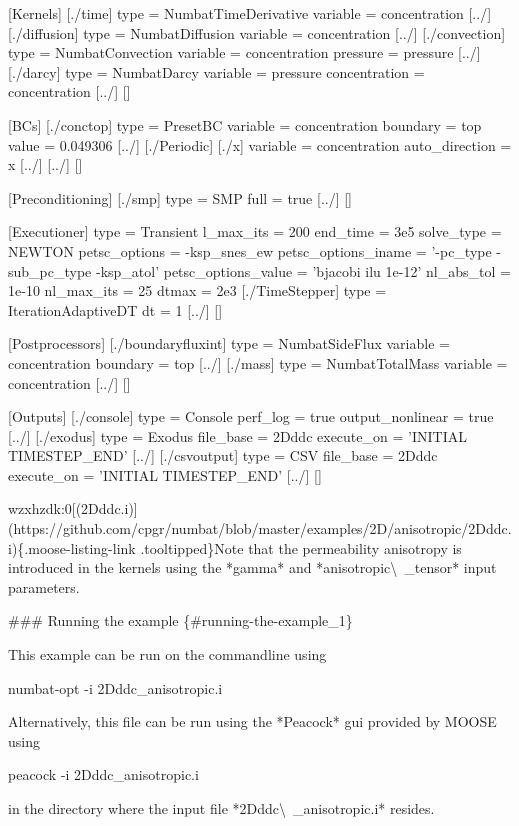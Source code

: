 \documentclass[12pt]{article}
\begin{document}
[Kernels]
  [./time]
    type = NumbatTimeDerivative
    variable = concentration
  [../]
  [./diffusion]
    type = NumbatDiffusion
    variable = concentration
  [../]
  [./convection]
    type = NumbatConvection
    variable = concentration
    pressure = pressure
  [../]
  [./darcy]
    type = NumbatDarcy
    variable = pressure
    concentration = concentration
  [../]
[]

[BCs]
  [./conctop]
    type = PresetBC
    variable = concentration
    boundary = top
    value = 0.049306
  [../]
  [./Periodic]
    [./x]
      variable = concentration
      auto\_direction = x
    [../]
  [../]
[]

[Preconditioning]
  [./smp]
    type = SMP
    full = true
  [../]
[]

[Executioner]
  type = Transient
  l\_max\_its = 200
  end\_time = 3e5
  solve\_type = NEWTON
  petsc\_options = -ksp\_snes\_ew
  petsc\_options\_iname = '-pc\_type -sub\_pc\_type -ksp\_atol'
  petsc\_options\_value = 'bjacobi ilu 1e-12'
  nl\_abs\_tol = 1e-10
  nl\_max\_its = 25
  dtmax = 2e3
  [./TimeStepper]
    type = IterationAdaptiveDT
    dt = 1
  [../]
[]

[Postprocessors]
  [./boundaryfluxint]
    type = NumbatSideFlux
    variable = concentration
    boundary = top
  [../]
  [./mass]
    type = NumbatTotalMass
    variable = concentration
  [../]
[]

[Outputs]
  [./console]
    type = Console
    perf\_log = true
    output\_nonlinear = true
  [../]
  [./exodus]
    type = Exodus
    file\_base = 2Dddc
    execute\_on = 'INITIAL TIMESTEP\_END'
  [../]
  [./csvoutput]
    type = CSV
    file\_base = 2Dddc
    execute\_on = 'INITIAL TIMESTEP\_END'
  [../]
[]

wzxhzdk:0[(2Dddc.i)](https://github.com/cpgr/numbat/blob/master/examples/2D/anisotropic/2Dddc.i)\{.moose-listing-link
.tooltipped\}Note that the permeability anisotropy is introduced in the kernels using
the *gamma* and *anisotropic\textbackslash~\_tensor* input parameters.

### Running the example \{#running-the-example\_1\}

This example can be run on the commandline using

        numbat-opt -i 2Dddc\_anisotropic.i

Alternatively, this file can be run using the *Peacock* gui provided by
MOOSE using

        peacock -i 2Dddc\_anisotropic.i

in the directory where the input file *2Dddc\textbackslash~\_anisotropic.i* resides.
\end{document}
